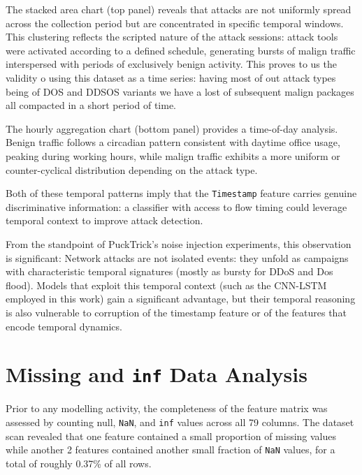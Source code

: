 \documentclass[../main.tex]{subfiles}
\begin{document}
The stacked area chart (top panel) reveals that attacks are not uniformly spread across the collection period but are concentrated in specific temporal windows. This clustering reflects the scripted nature of the attack sessions: attack tools were activated according to a defined schedule, generating bursts of malign traffic interspersed with periods of exclusively benign activity. This proves to us the validity o using this dataset as a time series: having most of out attack types being of DOS and DDSOS variants we have a lost of subsequent malign packages all compacted in a short period of time. 

The hourly aggregation chart (bottom panel) provides a time-of-day analysis.
Benign traffic follows a circadian pattern consistent with daytime office usage, peaking during working hours, while malign traffic exhibits a more uniform or counter-cyclical distribution depending on the attack type.  

Both of these temporal patterns imply that the \texttt{Timestamp} feature carries genuine discriminative information: a classifier with access to flow timing could leverage temporal context to improve attack detection.

From the standpoint of PuckTrick's noise injection experiments, this observation is significant: Network attacks are not isolated events: they unfold as campaigns with characteristic temporal signatures (mostly as bursty for DDoS and Dos flood).  Models that exploit this temporal context (such as the CNN-LSTM employed in this work) gain a significant advantage, but their temporal reasoning is also vulnerable to corruption of the timestamp feature or of the features that encode temporal dynamics.

\newpage
\section{Missing and \texttt{inf} Data Analysis}
\label{sec:missing-data}

Prior to any modelling activity, the completeness of the feature matrix was assessed by counting null, \texttt{NaN}, and \texttt{inf} values across all 79 columns. The dataset scan revealed that one feature contained a small proportion of missing values while another 2 features contained another small fraction of \texttt{NaN} values, for a total of roughly 0.37\% of all rows.
\end{document}
